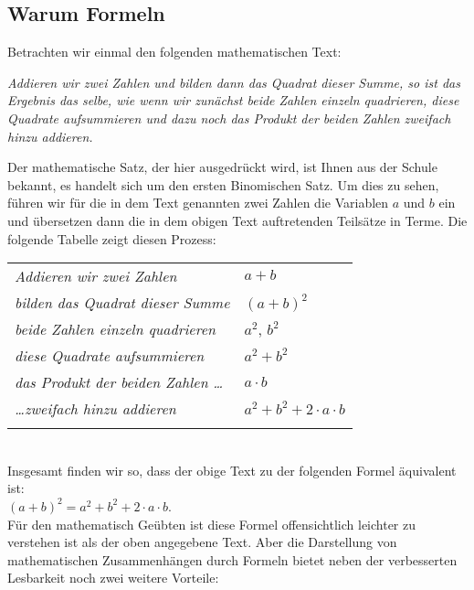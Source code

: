 \subsection{Warum Formeln}
Betrachten wir einmal den folgenden mathematischen Text: 
\begin{center}
\begin{minipage}{14cm}
{\em 
  Addieren wir zwei Zahlen und bilden dann das Quadrat dieser Summe, so ist das Ergebnis das
  selbe, wie wenn wir zun\"{a}chst beide Zahlen einzeln quadrieren, diese Quadrate aufsummieren 
  und dazu noch das Produkt der beiden Zahlen zweifach hinzu addieren.
}
\end{minipage}
\end{center}
Der mathematische Satz, der hier ausgedr\"{u}ckt wird, ist Ihnen aus der Schule bekannt,
es handelt sich um den ersten Binomischen Satz.  Um dies zu sehen, f\"{u}hren wir f\"{u}r die
in dem Text genannten zwei Zahlen die Variablen $a$ und $b$ ein und \"{u}bersetzen dann die 
in dem obigen Text auftretenden Teils\"{a}tze in Terme.  Die folgende Tabelle zeigt diesen Prozess: \\[0.3cm]
\hspace*{1.3cm} 
\begin{tabular}{ll}
  \emph{Addieren wir zwei Zahlen} & $a+b$ \\
  \emph{bilden das Quadrat dieser Summe} & $(a+b)^2$ \\
  \emph{beide Zahlen einzeln quadrieren} & $a^2$, $b^2$ \\
  \emph{diese Quadrate aufsummieren} & $a^2 + b^2$ \\
  \emph{das Produkt der beiden Zahlen \ldots} & $a\cdot b$ \\
  \emph{\ldots zweifach hinzu addieren} & $a^2 + b^2 + 2\cdot a \cdot b $ \\
  \emph{} & $ $ \\
\end{tabular} \\
Insgesamt finden wir so, dass der obige Text zu der folgenden Formel \"{a}quivalent ist: \\[0.2cm]
\hspace*{1.3cm} $(a+b)^2 = a^2 + b^2 + 2\cdot a\cdot b$. \\[0.2cm]
F\"{u}r den mathematisch Ge\"{u}bten ist diese Formel offensichtlich leichter zu verstehen ist als
der oben angegebene Text.  Aber die Darstellung von mathematischen Zusammenh\"{a}ngen durch
Formeln bietet neben der verbesserten Lesbarkeit noch zwei weitere Vorteile:
